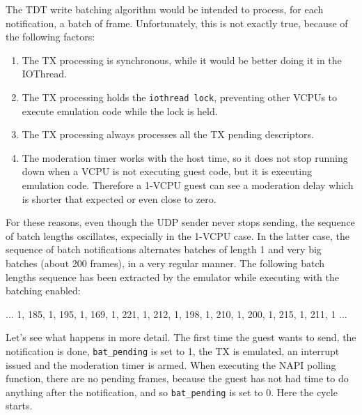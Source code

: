 \vspace{0.5cm}

The TDT write batching algorithm would be intended to process, for each notification, a batch of frame. Unfortunately, this is not
exactly true, because of the following factors:
\begin{enumerate}
    \item The TX processing is synchronous, while it would be better doing it in the IOThread.
    \item The TX processing holds the \texttt{iothread lock}, preventing other VCPUs to execute emulation code while the lock is held.
    \item The TX processing always processes all the TX pending descriptors.
    \item The moderation timer works with the host time, so it does not stop running down when a VCPU is not executing guest code, but
	  it is executing emulation code. Therefore a 1-VCPU guest can see a moderation delay which is shorter that expected or even
	  close to zero.
\end{enumerate}

For these reasons, even though the UDP sender never stops sending, the sequence of batch lengths oscillates, expecially in the 1-VCPU case.
In the latter case, the sequence of batch notifications alternates batches of length 1 and very big batches (about 200 frames), in a very 
regular manner. The following batch lengths sequence has been extracted by the emulator while executing with the batching enabled:
\begin{center}
... 1, 185, 1, 195, 1, 169, 1, 221, 1, 212, 1, 198, 1, 210, 1, 200, 1, 215, 1, 211, 1 ...
\end{center}

Let's see what happens in more detail. The first time the guest wants to send, the notification is done, \texttt{bat\_pending} is set to 1,
the TX is emulated, an interrupt issued and the moderation timer is armed. When executing the NAPI polling function, there are no 
pending frames, because the guest has not had time to do anything after the notification, and so \texttt{bat\_pending} is set to 0.
Here the cycle starts.

